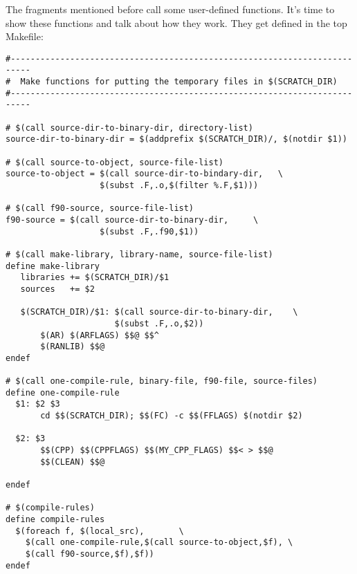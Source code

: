 The  fragments mentioned before call some
user-defined functions.  It's time to show these functions and
talk about how they work. They get defined in the top Makefile:
\begin{verbatim}
#--------------------------------------------------------------------------
#  Make functions for putting the temporary files in $(SCRATCH_DIR)
#--------------------------------------------------------------------------

# $(call source-dir-to-binary-dir, directory-list)
source-dir-to-binary-dir = $(addprefix $(SCRATCH_DIR)/, $(notdir $1))

# $(call source-to-object, source-file-list)
source-to-object = $(call source-dir-to-bindary-dir,   \
                   $(subst .F,.o,$(filter %.F,$1)))

# $(call f90-source, source-file-list)
f90-source = $(call source-dir-to-binary-dir,     \
                   $(subst .F,.f90,$1))

# $(call make-library, library-name, source-file-list)
define make-library
   libraries += $(SCRATCH_DIR)/$1
   sources   += $2

   $(SCRATCH_DIR)/$1: $(call source-dir-to-binary-dir,    \
                      $(subst .F,.o,$2))
       $(AR) $(ARFLAGS) $$@ $$^
       $(RANLIB) $$@
endef

# $(call one-compile-rule, binary-file, f90-file, source-files)
define one-compile-rule
  $1: $2 $3
       cd $$(SCRATCH_DIR); $$(FC) -c $$(FFLAGS) $(notdir $2)

  $2: $3
       $$(CPP) $$(CPPFLAGS) $$(MY_CPP_FLAGS) $$< > $$@
       $$(CLEAN) $$@

endef

# $(compile-rules)
define compile-rules
  $(foreach f, $(local_src),       \
    $(call one-compile-rule,$(call source-to-object,$f), \
    $(call f90-source,$f),$f))
endef
\end{verbatim}

